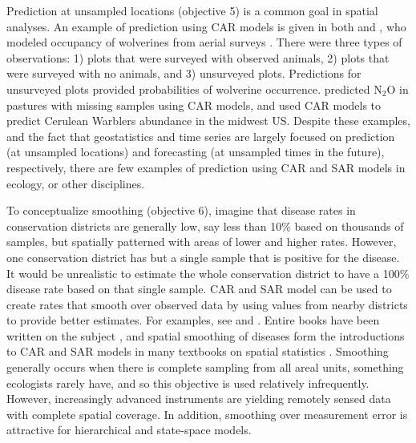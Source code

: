 \documentclass[11pt, titlepage]{article}\usepackage[]{graphicx}\usepackage[]{color}
\begin{document}
\begin{spacing}{1.9}
\begin{flushleft}
Prediction at unsampled locations (objective 5) is a common goal in spatial analyses.  An example of prediction using CAR models is given in both \citet{Mago:Ray:John:Valk:Daws:Bowm:mode:2007} and \citet{Gard:Lawl:Ver:Mago:Kell:coar:2010}, who modeled occupancy of wolverines from aerial surveys \citep[also see][]{John:Conn:Hoot:Ray:Pond:spat:2013}. There were three types of observations: 1) plots that were surveyed with observed animals, 2) plots that were surveyed with no animals, and 3) unsurveyed plots.  Predictions for unsurveyed plots provided probabilities of wolverine occurrence. \citet{Huan:Grac:Hu:Rowl:Meng:spat:2013} predicted N$_2$O in pastures with missing samples using CAR models, and \citet{Thog:Saue:Knut:hier:2004} used CAR models to predict Cerulean Warblers abundance in the midwest US. Despite these examples, and the fact that geostatistics and time series are largely focused on prediction (at unsampled locations) and forecasting (at unsampled times in the future), respectively, there are few examples of prediction using CAR and SAR models in ecology, or other disciplines.

To conceptualize smoothing (objective 6), imagine that disease rates in conservation districts are generally low, say less than 10\% based on thousands of samples, but spatially patterned with areas of lower and higher rates.  However, one conservation district has but a single sample that is positive for the disease.  It would be unrealistic to estimate the whole conservation district to have a 100\% disease rate based on that single sample. CAR and SAR model can be used to create rates that smooth over observed data by using values from nearby districts to provide better estimates. For examples, see \citet{Begu:Mart:Rue:Cumm:hier:2012} and \citet{Evan:Kirc:Eyle:Ryan:Walt:habi:2016}. Entire books have been written on the subject \citep[e.g.,][]{Elli:Wake:Best:Brig:2000,Pfei:Robi:Stev:Stev:Roge:spat:2008,Laws:stat:2013}, and spatial smoothing of diseases form the introductions to CAR and SAR models in many textbooks on spatial statistics \citep{Cres:stat:1993,Wall:Gotw:appl:2004, Scha:Gotw:stat:2005, Bane:Carl:Gelf:hier:2014}.  Smoothing generally occurs when there is complete sampling from all areal units, something ecologists rarely have, and so this objective is used relatively infrequently. However, increasingly advanced instruments \citep[e.g., LIDAR, ][]{Camp:Wynn:intr:2011} are yielding remotely sensed data with complete spatial coverage.  In addition, smoothing over measurement error is attractive for hierarchical \citep{Cres:Cald:Clar:VerH:acco:2009} and state-space \citep{deVa:Hast:fitt:2002} models.


\end{flushleft}
\end{spacing}
\end{document}
